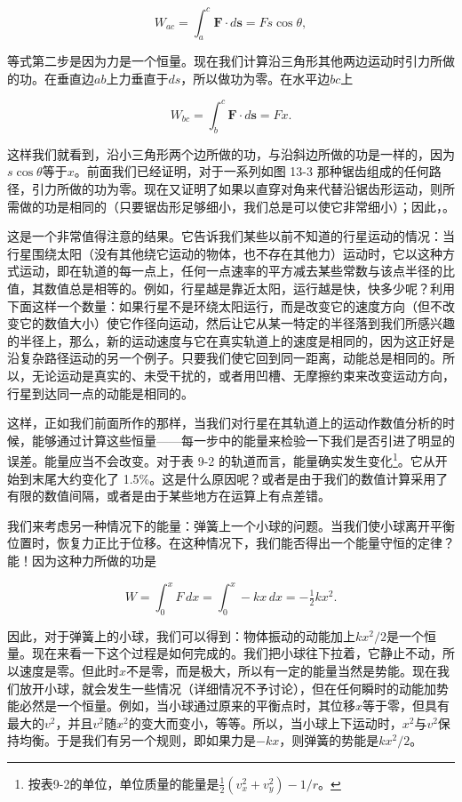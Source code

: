 \documentclass[12pt,oneside]{book}
\providecommand{\FLPvec}[1]{\boldsymbol{#1}}
\providecommand{\FLPF}[0]{\FLPvec{F}}
\providecommand{\FLPs}[0]{\FLPvec{s}}
\begin{document}
\begin{equation*}
W_{ac}=\int_a^c\FLPF\cdot d\FLPs=Fs\cos\theta,
\end{equation*}


等式第二步是因为力是一个恒量。现在我们计算沿三角形其他两边运动时引力所做的功。在垂直边$ab$上力垂直于$ds$，所以做功为零。在水平边$bc$上

\begin{equation*}
W_{bc}=\int_b^c\FLPF\cdot d\FLPs=Fx.
\end{equation*}

这样我们就看到，沿小三角形两个边所做的功，与沿斜边所做的功是一样的，因为$s\cos\theta$等于$x$。前面我们已经证明，对于一系列如图 13-3 那种锯齿组成的任何路径，引力所做的功为零。现在又证明了如果以直穿对角来代替沿锯齿形运动，则所需做的功是相同的（只要锯齿形足够细小，我们总是可以使它非常细小）；因此，。


这是一个非常值得注意的结果。它告诉我们某些以前不知道的行星运动的情况：当行星围绕太阳（没有其他绕它运动的物体，也不存在其他力）运动时，它以这种方式运动，即在轨道的每一点上，任何一点速率的平方减去某些常数与该点半径的比值，其数值总是相等的。例如，行星越是靠近太阳，运行越是快，快多少呢？利用下面这样一个数量：如果行星不是环绕太阳运行，而是改变它的速度方向（但不改变它的数值大小）使它作径向运动，然后让它从某一特定的半径落到我们所感兴趣的半径上，那么，新的运动速度与它在真实轨道上的速度是相同的，因为这正好是沿复杂路径运动的另一个例子。只要我们使它回到同一距离，动能总是相同的。所以，无论运动是真实的、未受干扰的，或者用凹槽、无摩擦约束来改变运动方向，行星到达同一点的动能是相同的。


这样，正如我们前面所作的那样，当我们对行星在其轨道上的运动作数值分析的时候，能够通过计算这些恒量——每一步中的能量来检验一下我们是否引进了明显的误差。能量应当不会改变。对于表 9-2 的轨道而言，能量确实发生变化\footnote{按表9-2的单位，单位质量的能量是$ \tfrac{1}{2}(v_x^2 + v_y^2) - 1/r $。}。它从开始到末尾大约变化了 1.5\%。这是什么原因呢？或者是由于我们的数值计算采用了有限的数值间隔，或者是由于某些地方在运算上有点差错。


我们来考虑另一种情况下的能量：弹簧上一个小球的问题。当我们使小球离开平衡位置时，恢复力正比于位移。在这种情况下，我们能否得出一个能量守恒的定律？能！因为这种力所做的功是


\begin{equation}
\label{Eq:I:13:13}
W=\int_0^xF\,dx=\int_0^x-kx\,dx=-\tfrac{1}{2}kx^2.
\end{equation}

因此，对于弹簧上的小球，我们可以得到：物体振动的动能加上$kx^2/2$是一个恒量。现在来看一下这个过程是如何完成的。我们把小球往下拉着，它静止不动，所以速度是零。但此时$x$不是零，而是极大，所以有一定的能量当然是势能。现在我们放开小球，就会发生一些情况（详细情况不予讨论），但在任何瞬时的动能加势能必然是一个恒量。例如，当小球通过原来的平衡点时，其位移$x$等于零，但具有最大的$v^2$，并且$v^2$随$x^2$的变大而变小，等等。所以，当小球上下运动时，$x^2$与$v^2$保持均衡。于是我们有另一个规则，即如果力是$-kx$，则弹簧的势能是$kx^2/2$。
\end{document}
